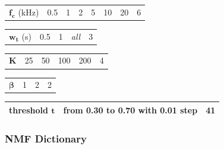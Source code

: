 \documentclass[twocolumn]{svjour3}          %
\begin{document}
\begin{table}[t]
\begin{tabularx}{17.5cm}{L{3cm}@{}C{2cm}@{}C{2cm}@{}@{}C{2cm}@{}@{}C{2cm}@{}@{}C{2cm}@{}@{}C{2cm}@{}@{}C{2cm}@{}}
   $\mathbf{f_c}$ (kHz) & 0.5 & 1 & 2 & 5 & 10 & 20  & 6\\
\end{tabularx}

\begin{tabularx}{17.5cm}{L{3cm}@{}C{4cm}@{}@{}C{4cm}@{}@{}C{4cm}@{}C{2cm}@{}}
    $\mathbf{w_t}$ (s) & 0.5 & 1 & \textit{all} & 3
\end{tabularx}

\begin{tabularx}{17.5cm}{L{3cm}@{}C{3cm}@{}@{}C{3cm}@{}@{}C{3cm}@{}@{}C{3cm}@{}C{2cm}@{}}
    $\mathbf{K}$ & 25 & 50 & 100 & 200  & 4\\
\end{tabularx}


\begin{tabularx}{17.5cm}{L{3cm}@{}C{6cm}@{}@{}C{6cm}@{}C{2cm}@{}}
   $\mathbf{\beta}$ & 1 & 2 & 2\\
\end{tabularx}

\begin{tabularx}{17.5cm}{L{3cm}@{}C{12cm}@{}C{2cm}@{}}
   threshold $\mathbf{t}$  &  from 0.30 to 0.70 with 0.01 step & 41\\
   \bottomrule
\end{tabularx}

\label{tab:experimental_factorsNMF}
\end{table}


\subsubsection{NMF Dictionary}\label{part:dictionary_learning}
\end{document}

